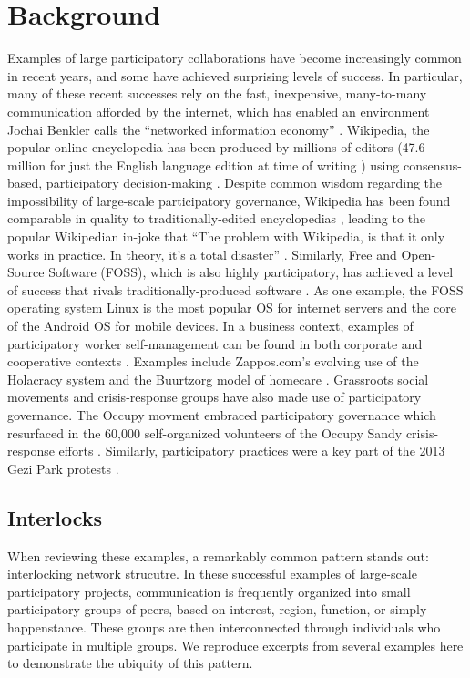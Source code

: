 \documentclass[manuscript,screen,review,acmsmall]{acmart}
\begin{document}
\section{Background}

Examples of large participatory collaborations have become increasingly common in recent years,
and some have achieved surprising levels of success.
In particular, many of these recent successes rely on the fast, inexpensive, many-to-many communication afforded by the internet,
which has enabled an environment Jochai Benkler calls the ``networked information economy''
\cite{benkler_wealth_2006}.
Wikipedia, the popular online encyclopedia has been produced by millions of editors (47.6 million for just the English language edition at time of writing \cite{noauthor_list_2024, noauthor_wikipediawikipedians_2024})
using consensus-based, participatory decision-making \cite{keegan_evolution_2017, forte_scaling_2008}.
Despite common wisdom regarding the impossibility of large-scale participatory governance,
Wikipedia has been found comparable in quality to traditionally-edited encyclopedias \cite{giles_internet_2005},
leading to the popular Wikipedian in-joke that
``The problem with Wikipedia, is that it only works in practice. In theory, it's a total disaster'' \cite{elsharbaty_editing_2016}.
Similarly, Free and Open-Source Software (FOSS),
which is also highly participatory,
has achieved a level of success that rivals traditionally-produced software
\cite{benkler_wealth_2006, raymond_cathedral_1999}.
As one example, the FOSS operating system Linux is the most popular OS for internet servers and the core of the Android OS for mobile devices.
In a business context, examples of participatory worker self-management can be found in both corporate and cooperative contexts \cite{laloux_reinventing_2014, lee_self-managing_2017}.
Examples include Zappos.com's evolving use of the Holacracy system
\cite{robertson_holacracy_2015, groth_zappos_2020}
and the Buurtzorg model of homecare
\cite{monsen_buurtzorg_2013, gray_home_2015}.
Grassroots social movements and crisis-response groups have also made use of participatory governance.
The Occupy movment embraced participatory governance \cite{detar_intertwinkles:_2013, gonzalez-bailon_networked_2016}
which resurfaced in the 60,000 self-organized volunteers of the Occupy Sandy crisis-response efforts \cite{landau_place-based_2017, brugh_combining_2019}.
Similarly, participatory practices were a key part of the 2013 Gezi Park protests
\cite{tufekci_twitter_2017}.

\subsection{Interlocks}
When reviewing these examples, a remarkably common pattern stands out: interlocking network strucutre.
In these successful examples of large-scale participatory projects,
communication is frequently organized into small participatory groups of peers, based on interest, region, function, or simply happenstance.
These groups are then interconnected through individuals who participate in multiple groups.
We reproduce excerpts from several examples here to demonstrate the ubiquity of this pattern.
\end{document}
